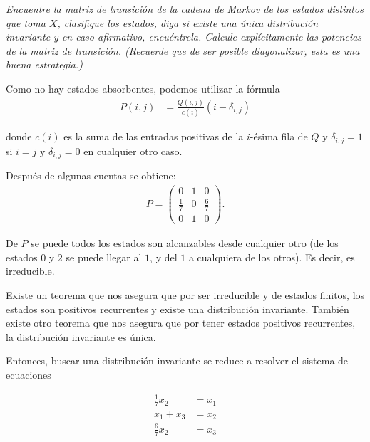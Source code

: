 \emph{
    Encuentre la matriz de transici\'on de la cadena de Markov de los estados distintos que toma $X$, 
    clasifique los estados, diga si existe una \'unica distribuci\'on invariante y en caso afirmativo, 
    encu\'entrela. Calcule expl\'icitamente las potencias de la matriz de transici\'on. 
    (Recuerde que de ser posible diagonalizar, esta es una buena estrategia.)\pn
}

\afterstatement\pn

Como no hay estados absorbentes, podemos utilizar la fórmula
\begin{align}
        P(i,j)  &=  \frac{Q(i, j)}{c(i)} (i-\delta_{i,j})
\end{align}

donde $c(i)$ es la suma de las entradas positivas de la $i$-ésima fila de $Q$ y $\delta_{i,j} = 1$
si $i = j$ y $\delta_{i,j} = 0$ en cualquier otro caso.\pn

Después de algunas cuentas se obtiene:
\begin{align}
     P=
        \begin{pmatrix}
            0           &   1   &   0               \\
            \frac{1}{7} &   0   &   \frac{6}{7}     \\
            0           &   1   &   0
        \end{pmatrix}.   
\end{align}\pn

De $P$ se puede todos los estados son alcanzables desde cualquier otro (de los estados $0$ y $2$ 
se puede llegar al $1$, y del $1$ a cualquiera de los otros). Es decir, es irreducible.\pn

Existe un teorema que nos asegura que por ser irreducible y de estados finitos, los estados son positivos
recurrentes y existe una distribución invariante. También existe otro teorema que nos asegura que por tener
estados positivos recurrentes, la distribución invariante es única.\pn

Entonces, buscar una distribución invariante se reduce a resolver el sistema de ecuaciones

\begin{align}
        \frac{1}{7}x_2              &=      x_1 \\
        x_1 + x_3                   &=      x_2 \\
        \frac{6}{7}x_2              &=      x_3 \\
\end{align}

